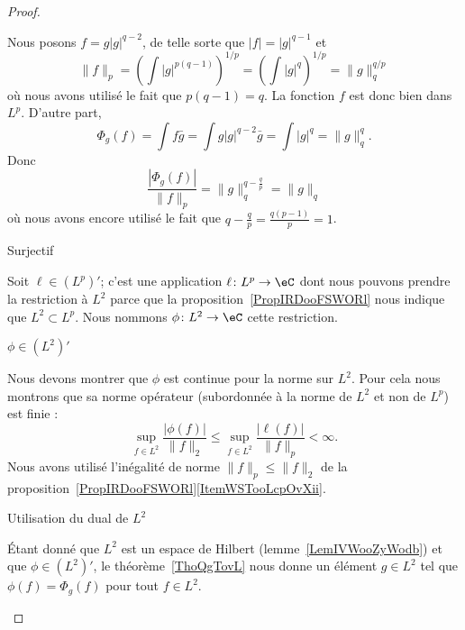 \begin{proof}
\begin{subproof}
            Nous posons \( f=g| g |^{q-2}\), de telle sorte que \( | f |=| g |^{q-1}\) et
            \begin{equation}
                \| f \|_p=\left( \int| g |^{p(q-1)} \right)^{1/p}=\left( \int | g |^q \right)^{1/p}=\| g \|_q^{q/p}
            \end{equation}
            où nous avons utilisé le fait que \( p(q-1)=q\). La fonction \( f\) est donc bien dans \( L^p\). D'autre part,
            \begin{equation}
                \Phi_g(f)=\int f\bar g=\int g| g |^{q-2}\bar g=\int | g |^q=\| g \|_q^q.
            \end{equation}
            Donc
            \begin{equation}
                \frac{ | \Phi_g(f) | }{ \| f \|_p }=\| g \|_q^{q-\frac{ q }{ p }}=\| g \|_q
            \end{equation}
            où nous avons encore utilisé le fait que \( q-\frac{ q }{ p }=\frac{ q(p-1) }{ p }=1\).

        \item[Surjectif]

            Soit \( \ell\in (L^p)'\); c'est une application \( \ell\colon L^p\to \eC\) dont nous pouvons prendre la restriction à \( L^2\) parce que la proposition~\ref{PropIRDooFSWORl} nous indique que \( L^2\subset L^p\). Nous nommons \( \phi\colon L^2\to \eC\) cette restriction.

            \begin{subproof}

                \item[\( \phi\in (L^2)'\)]

                    Nous devons montrer que \( \phi\) est continue pour la norme sur \( L^2\). Pour cela nous montrons que sa norme opérateur (subordonnée à la norme de \( L^2\) et non de \( L^p\)) est finie :
                    \begin{equation}
                        \sup_{f\in L^2}\frac{ | \phi(f) | }{ \| f \|_{2} }\leq \sup_{f\in L^2}\frac{ | \ell(f) | }{ \| f \|_p }<\infty.
                    \end{equation}
                    Nous avons utilisé l'inégalité de norme \( \| f \|_p\leq \| f \|_2\) de la proposition~\ref{PropIRDooFSWORl}\ref{ItemWSTooLcpOvXii}.

                \item[Utilisation du dual de \( L^2\)]

                    Étant donné que \( L^2\) est un espace de Hilbert (lemme~\ref{LemIVWooZyWodb}) et que \( \phi\in (L^2)'\), le théorème~\ref{ThoQgTovL} nous donne un élément \( g\in L^2\) tel que \( \phi(f)=\Phi_g(f)\) pour tout \( f\in L^2\).


\end{subproof}
\end{subproof}
\end{proof}
